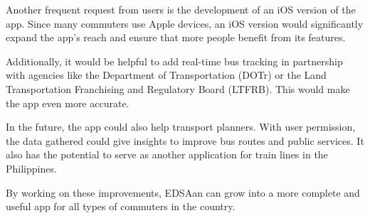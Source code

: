 \documentclass{icsthesis}
\begin{document}
\begin{mainmatter}
Another frequent request from users is the development of an iOS version of the app. Since many commuters use Apple devices, an iOS version would significantly expand the app’s reach and ensure that more people benefit from its features.

Additionally, it would be helpful to add real-time bus tracking in partnership with agencies like the Department of Transportation (DOTr) or the Land Transportation Franchising and Regulatory Board (LTFRB). This would make the app even more accurate.

In the future, the app could also help transport planners. With user permission, the data gathered could give insights to improve bus routes and public services. It also has the potential to serve as another application for train lines in the Philippines.

By working on these improvements, EDSAan can grow into a more complete and useful app for all types of commuters in the country.
		
			
	\end{mainmatter}
\end{document}
